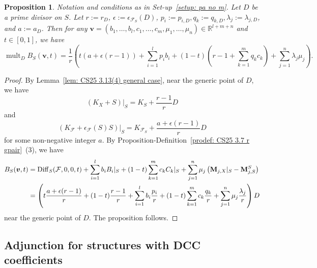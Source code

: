 \documentclass[11pt,reqno]{amsart}
\numberwithin{equation}{section}
\newcommand{\Mm}{{\bf{M}}}
\newcommand{\Diff}{\operatorname{Diff}}
\newcommand{\mult}{\operatorname{mult}}
\newcommand{\Ff}{\mathcal{F}}
\newtheorem{prop}[thm]{Proposition}
\theoremstyle{definition}
\begin{document}
\begin{prop}\label{prop: explicit formula}
   Notation and conditions as in Set-up~\ref{setup: pa no m}. Let $D$ be a prime divisor on $S$. Let $r:=r_D$, $\epsilon:=\epsilon_{\Ff_S}(D)$, $p_i:=p_{i,D},q_k:=q_{k,D},\lambda_j:=\lambda_{j,D}$, and $a:=a_D$. Then for any $\bm{v}=(b_1,\dots,b_l,c_1,\dots,c_m,\mu_1,\dots,\mu_n)\in\mathbb R^{l+m+n}$ and $t\in [0,1]$, we have
   $$\mult_DB_S(\bm{v},t)=\frac{1}{r}\left(t(a+\epsilon(r-1))+\sum_{i=1}^lp_ib_i+(1-t)\left(r-1+\sum_{k=1}^mq_kc_k\right)+\sum_{j=1}^n\lambda_j\mu_j\right).$$
\end{prop}
\begin{proof} 
By Lemma~\ref{lem: CS25 3.13(4) general case}, near the generic point of $D$, we have
$$(K_{X}+S)|_S=K_S+\frac{r-1}{r}D$$
and
$$(K_{\Ff}+\epsilon_{\Ff}(S)S)|_S=K_{\Ff_S}+\frac{a+\epsilon(r-1)}{r}D$$
for some non-negative integer $a$. By Proposition-Definition~\ref{prodef: CS25 3.7 r gpair}~(3), we have
\begin{align*}
    B_S(\bm{v},t)&=\Diff_S(\Ff,0,0,t)+\sum_{i=1}^lb_iB_i|_S+(1-t)\sum_{k=1}^mc_kC_k|_S+\sum_{j=1}^n\mu_j\left(\Mm_{j,X}|_S-\Mm_{j,S}^S\right)\\
    &=\left(t\frac{a+\epsilon(r-1)}{r}+(1-t)\frac{r-1}{r}+\sum_{i=1}^lb_i\frac{p_i}{r}+(1-t)\sum_{k=1}^mc_k\frac{q_k}{r}+\sum_{j=1}^n\mu_j\frac{\lambda_j}{r}\right)D
\end{align*}
near the generic point of $D$. The proposition follows.
\end{proof}

\subsection{Adjunction for structures with DCC coefficients}
\end{document}
